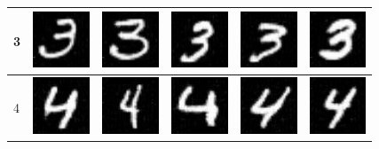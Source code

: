 \begin{table}[H]
\begin{tabular}{|llllll|}
3 & \includegraphics[width=1.69cm, height=1.69cm]{Files/MNIST/0-3.png}  &\includegraphics[width=1.69cm, height=1.69cm]{Files/MNIST/1-5.png}   & \includegraphics[width=1.69cm, height=1.69cm]{Files/MNIST/2-7.png}  & \includegraphics[width=1.69cm, height=1.69cm]{Files/MNIST/5-3.png}  & \includegraphics[width=1.69cm, height=1.69cm]{Files/MNIST/6-5.png} \\ \hline

4 & \includegraphics[width=1.69cm, height=1.69cm]{Files/MNIST/0-4.png}  &\includegraphics[width=1.69cm, height=1.69cm]{Files/MNIST/1-6.png}   & \includegraphics[width=1.69cm, height=1.69cm]{Files/MNIST/3-0.png}  & \includegraphics[width=1.69cm, height=1.69cm]{Files/MNIST/5-4.png}  & \includegraphics[width=1.69cm, height=1.69cm]{Files/MNIST/6-6.png} \\ \hline


\end{tabular}
\end{table}
